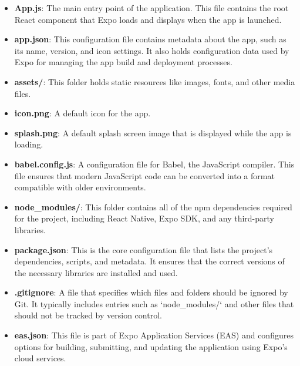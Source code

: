 \begin{itemize}
    \item \textbf{App.js}: The main entry point of the application. This file contains the root React component that Expo loads and displays when the app is launched.

    \item \textbf{app.json}: This configuration file contains metadata about the app, such as its name, version, and icon settings. It also holds configuration data used by Expo for managing the app build and deployment processes.

    \item \textbf{assets/}: This folder holds static resources like images, fonts, and other media files.
    
    \item \textbf{icon.png}: A default icon for the app.

    \item \textbf{splash.png}: A default splash screen image that is displayed while the app is loading.

    \item \textbf{babel.config.js}: A configuration file for Babel, the JavaScript compiler. This file ensures that modern JavaScript code can be converted into a format compatible with older environments.

    \item \textbf{node\_modules/}: This folder contains all of the npm dependencies required for the project, including React Native, Expo SDK, and any third-party libraries.

    \item \textbf{package.json}: This is the core configuration file that lists the project's dependencies, scripts, and metadata. It ensures that the correct versions of the necessary libraries are installed and used.

    \item \textbf{.gitignore}: A file that specifies which files and folders should be ignored by Git. It typically includes entries such as `node\_modules/` and other files that should not be tracked by version control.

    \item \textbf{eas.json}: This file is part of Expo Application Services (EAS) and configures options for building, submitting, and updating the application using Expo's cloud services.
\end{itemize}

